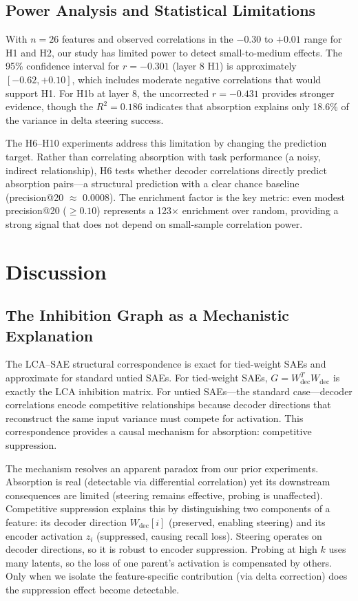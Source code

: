 \documentclass{article}
\begin{document}
\subsection{Power Analysis and Statistical Limitations}

With $n = 26$ features and observed correlations in the $-0.30$ to $+0.01$ range for H1 and H2, our study has limited power to detect small-to-medium effects. The 95\% confidence interval for $r = -0.301$ (layer 8 H1) is approximately $[-0.62, +0.10]$, which includes moderate negative correlations that would support H1. For H1b at layer 8, the uncorrected $r = -0.431$ provides stronger evidence, though the $R^2 = 0.186$ indicates that absorption explains only 18.6\% of the variance in delta steering success.

The H6--H10 experiments address this limitation by changing the prediction target. Rather than correlating absorption with task performance (a noisy, indirect relationship), H6 tests whether decoder correlations directly predict absorption pairs---a structural prediction with a clear chance baseline (precision@20 $\approx$ 0.0008). The enrichment factor is the key metric: even modest precision@20 ($\geq 0.10$) represents a 123$\times$ enrichment over random, providing a strong signal that does not depend on small-sample correlation power.

\section{Discussion}
\label{sec:discussion}

\subsection{The Inhibition Graph as a Mechanistic Explanation}

The LCA--SAE structural correspondence is exact for tied-weight SAEs and approximate for standard untied SAEs. For tied-weight SAEs, $G = W_{\text{dec}}^T W_{\text{dec}}$ is exactly the LCA inhibition matrix. For untied SAEs---the standard case---decoder correlations encode competitive relationships because decoder directions that reconstruct the same input variance must compete for activation. This correspondence provides a causal mechanism for absorption: competitive suppression.

The mechanism resolves an apparent paradox from our prior experiments. Absorption is real (detectable via differential correlation) yet its downstream consequences are limited (steering remains effective, probing is unaffected). Competitive suppression explains this by distinguishing two components of a feature: its decoder direction $W_{\text{dec}}[i]$ (preserved, enabling steering) and its encoder activation $z_i$ (suppressed, causing recall loss). Steering operates on decoder directions, so it is robust to encoder suppression. Probing at high $k$ uses many latents, so the loss of one parent's activation is compensated by others. Only when we isolate the feature-specific contribution (via delta correction) does the suppression effect become detectable.
\end{document}
